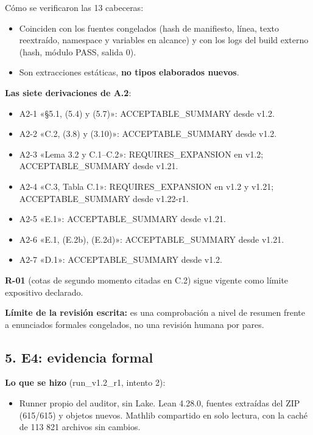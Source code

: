 \documentclass[
]{article}
\providecommand{\tightlist}{%
  \setlength{\itemsep}{0pt}\setlength{\parskip}{0pt}}
\begin{document}
Cómo se verificaron las 13 cabeceras:

\begin{itemize}
\tightlist
\item
  Coinciden con los fuentes congelados (hash de manifiesto, línea, texto
  reextraído, namespace y variables en alcance) y con los logs del build
  externo (hash, módulo PASS, salida 0).
\item
  Son extracciones estáticas, \textbf{no tipos elaborados nuevos}.
\end{itemize}

\textbf{Las siete derivaciones de A.2}:

\begin{itemize}
\tightlist
\item
  A2-1 «§5.1, (5.4) y (5.7)»: ACCEPTABLE\_SUMMARY desde v1.2.
\item
  A2-2 «C.2, (3.8) y (3.10)»: ACCEPTABLE\_SUMMARY desde v1.2.
\item
  A2-3 «Lema 3.2 y C.1--C.2»: REQUIRES\_EXPANSION en v1.2;
  ACCEPTABLE\_SUMMARY desde v1.21.
\item
  A2-4 «C.3, Tabla C.1»: REQUIRES\_EXPANSION en v1.2 y v1.21;
  ACCEPTABLE\_SUMMARY desde v1.22-r1.
\item
  A2-5 «E.1»: ACCEPTABLE\_SUMMARY desde v1.21.
\item
  A2-6 «E.1, (E.2b), (E.2d)»: ACCEPTABLE\_SUMMARY desde v1.21.
\item
  A2-7 «D.1»: ACCEPTABLE\_SUMMARY desde v1.2.
\end{itemize}

\textbf{R-01} (cotas de segundo momento citadas en C.2) sigue vigente
como límite expositivo declarado.

\textbf{Límite de la revisión escrita:} es una comprobación a nivel de
resumen frente a enunciados formales congelados, no una revisión humana
por pares.

\subsection{5. E4: evidencia formal}\label{5-e4-evidencia-formal}

\textbf{Lo que se hizo} (run\_v1.2\_r1, intento 2):

\begin{itemize}
\tightlist
\item
  Runner propio del auditor, sin Lake. Lean 4.28.0, fuentes extraídas
  del ZIP (615/615) y objetos nuevos. Mathlib compartido en solo
  lectura, con la caché de 113 821 archivos sin cambios.
\end{itemize}
\end{document}
